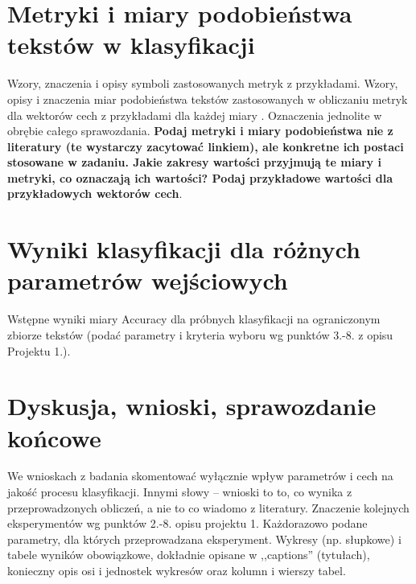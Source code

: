 \documentclass{article}
\begin{document}
\section{Metryki i miary podobieństwa tekstów w klasyfikacji}
Wzory, znaczenia i opisy symboli zastosowanych metryk z
przykładami. Wzory, opisy i znaczenia miar
podobieństwa tekstów zastosowanych w obliczaniu metryk dla wektorów cech z
przykładami dla każdej miary \cite{niewiadomski08}.  Oznaczenia jednolite w obrębie całego sprawozdania.  {\bf Podaj metryki i miary
podobieństwa nie z literatury (te wystarczy zacytować linkiem), ale konkretne ich
postaci stosowane w zadaniu. Jakie zakresy wartości przyjmują te miary i
metryki, co oznaczają ich wartości? Podaj przykładowe wartości dla przykładowych wektorów cech}. \\

\section{Wyniki klasyfikacji dla różnych parametrów wejściowych}
Wstępne wyniki miary Accuracy dla próbnych klasyfikacji na ograniczonym zbiorze tekstów (podać parametry i kryteria
wyboru wg punktów 3.-8. z opisu Projektu 1.).


\section{Dyskusja, wnioski, sprawozdanie końcowe}
We wnioskach z badania skomentować wyłącznie wpływ parametrów i cech na jakość procesu klasyfikacji. Innymi słowy – wnioski to to, co wynika z przeprowadzonych obliczeń, a nie to co wiadomo z literatury.
Znaczenie kolejnych eksperymentów wg punktów 2.-8. opisu projektu 1.  Każdorazowo
podane parametry, dla których przeprowadzana eksperyment.
Wykresy (np. słupkowe) i tabele wyników
obowiązkowe, dokładnie opisane w ,,captions'' (tytułach), konieczny opis osi i
jednostek wykresów oraz kolumn i wierszy tabel.\\
\end{document}

